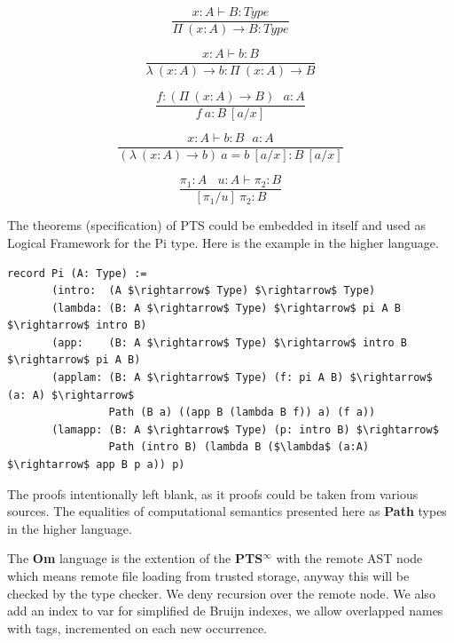 \documentclass{aip-cp}
\begin{document}
\begin{equation}
\tag{$\Pi$-formation}
\dfrac
{x:A \vdash B : Type}
{\Pi\ (x:A) \rightarrow B : Type}
\end{equation}

\begin{equation}
\tag{$\lambda$-intro}
\dfrac
{x:A \vdash b : B}
{\lambda\ (x:A) \rightarrow b : \Pi\ (x: A) \rightarrow B }
\end{equation}

\begin{equation}
\tag{$App$-elimination}
\dfrac
{f: (\Pi\ (x:A) \rightarrow B)\ \ \ a: A}
{f\ a : B\ [a/x]}
\end{equation}

\begin{equation}
\tag{$\beta$-computation}
\dfrac
{x:A \vdash b: B\ \ \ a:A}
{(\lambda\ (x:A) \rightarrow b)\ a = b\ [a/x] : B\ [a/x]}
\end{equation}

\begin{equation}
\tag{subst}
\dfrac
{\pi_1 : A\ \ \ \ u:A \vdash \pi_2 : B}
{[\pi_1/u]\ \pi_2 : B}
\end{equation}

The theorems (specification) of PTS could be embedded in itself and used as Logical Framework for the Pi type.
Here is the example in the higher language.

\begin{lstlisting}[mathescape=true]
record Pi (A: Type) :=
       (intro:  (A $\rightarrow$ Type) $\rightarrow$ Type)
       (lambda: (B: A $\rightarrow$ Type) $\rightarrow$ pi A B $\rightarrow$ intro B)
       (app:    (B: A $\rightarrow$ Type) $\rightarrow$ intro B $\rightarrow$ pi A B)
       (applam: (B: A $\rightarrow$ Type) (f: pi A B) $\rightarrow$ (a: A) $\rightarrow$
                Path (B a) ((app B (lambda B f)) a) (f a))
       (lamapp: (B: A $\rightarrow$ Type) (p: intro B) $\rightarrow$
                Path (intro B) (lambda B ($\lambda$ (a:A) $\rightarrow$ app B p a)) p)
\end{lstlisting}

The proofs intentionally left blank, as it proofs could be taken from various sources\cite{Henk93}.
The equalities of computational semantics presented here as {\bf Path} types in the higher language.

The {\bf Om} language is the extention of the {\bf PTS$^\infty$} with the remote AST node which means remote file loading from trusted storage, anyway this will be checked by the type checker.
We deny recursion over the remote node.
We also add an index to var for simplified de Bruijn indexes, we allow overlapped names with tags, incremented on each new occurrence.
\end{document}
